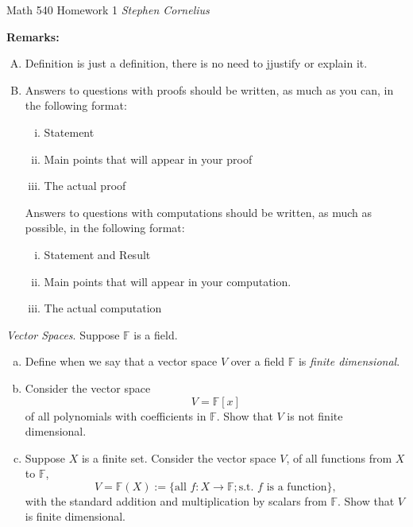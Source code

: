 \documentclass{article}
\begin{document}
\begin{center}
    Math 540
    \hfill Homework 1
    \hfill \textit{Stephen Cornelius}
\end{center}
\textbf{Remarks:} \\
\begin{enumerate}[A)]
    \item Definition is just a definition, there is no need to jjustify or explain it.
    \item Answers to questions with proofs should be written, as much as you can, in the following format: \\
    \begin{enumerate}[i)]
        \item Statement
        \item Main points that will appear in your proof
        \item The actual proof
    \end{enumerate}
    Answers to questions with computations should be written, as much as possible, in the following format:
    \begin{enumerate}[i)]
        \item Statement and Result
        \item Main points that will appear in your computation.
        \item The actual computation
    \end{enumerate}
\end{enumerate}
\begin{problem}
    \textit{Vector Spaces}. Suppose $\mathbb{F}$ is a field.
    \begin{enumerate}[a)]
        \item Define when we say that a vector space $V$ over a field $\mathbb{F}$ is \textit{finite dimensional}.
        \item Consider the vector space
        \[
            V = \mathbb{F}[x]
        \]
        of all polynomials with coefficients in $\mathbb{F}$. Show that $V$ is not finite dimensional.
        \item Suppose $X$ is a finite set. Consider the vector space $V$, of all functions from $X$ to $\mathbb{F}$,
        \[
            V = \mathbb{F}(X):= \{\text{all }f: X \to \mathbb{F}; \text{s.t. $f$ is a function}\},
        \]
        with the standard addition and multiplication by scalars from $\mathbb{F}$. Show that $V$ is finite dimensional.
    \end{enumerate}
\end{problem}
\end{document}
